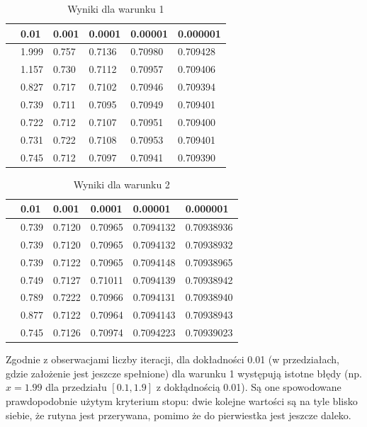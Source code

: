 \documentclass{article}
\begin{document}
\begin{table}[H]
\centering
\begin{tabular}{|l|l|l|l|l|l|}
\hline
& 0.01 & 0.001 & 0.0001 & 0.00001 & 0.000001 \\ \hline
[0.10, 1.90] & 1.999 & 0.757 & 0.7136 & 0.70980 & 0.709428 \\ \hline
[0.20, 1.90] & 1.157 & 0.730 & 0.7112 & 0.70957 & 0.709406 \\ \hline
[0.30, 1.90] & 0.827 & 0.717 & 0.7102 & 0.70946 & 0.709394 \\ \hline
[0.40, 1.90] & 0.739 & 0.711 & 0.7095 & 0.70949 & 0.709401 \\ \hline
[0.50, 1.90] & 0.722 & 0.712 & 0.7107 & 0.70951 & 0.709400 \\ \hline
[0.60, 1.90] & 0.731 & 0.722 & 0.7108 & 0.70953 & 0.709401 \\ \hline
[0.70, 1.90] & 0.745 & 0.712 & 0.7097 & 0.70941 & 0.709390 \\ \hline
\end{tabular}
\caption{Wyniki dla warunku 1}
\end{table}

\begin{table}[H]
\centering
\begin{tabular}{|l|l|l|l|l|l|}
\hline
& 0.01 & 0.001 & 0.0001 & 0.00001 & 0.000001 \\ \hline
[0.10, 1.90] & 0.739 & 0.7120 & 0.70965 & 0.7094132 & 0.70938936 \\ \hline
[0.20, 1.90] & 0.739 & 0.7120 & 0.70965 & 0.7094132 & 0.70938932 \\ \hline
[0.30, 1.90] & 0.739 & 0.7122 & 0.70965 & 0.7094148 & 0.70938965 \\ \hline
[0.40, 1.90] & 0.749 & 0.7127 & 0.71011 & 0.7094139 & 0.70938942 \\ \hline
[0.50, 1.90] & 0.789 & 0.7222 & 0.70966 & 0.7094131 & 0.70938940 \\ \hline
[0.60, 1.90] & 0.877 & 0.7122 & 0.70964 & 0.7094143 & 0.70938943 \\ \hline
[0.70, 1.90] & 0.745 & 0.7126 & 0.70974 & 0.7094223 & 0.70939023 \\ \hline
\end{tabular}
\caption{Wyniki dla warunku 2}
\end{table}

Zgodnie z obserwacjami liczby iteracji, dla dokładności 0.01 (w przedziałach, gdzie założenie jest jeszcze spełnione)
dla warunku 1 występują istotne błędy (np. $x=1.99$ dla przedziału $[0.1, 1.9]$ z dokłądnością 0.01). Są one spowodowane
prawdopodobnie użytym kryterium stopu: dwie kolejne wartości są na tyle blisko siebie, że rutyna jest przerywana, pomimo 
że do pierwiestka jest jeszcze daleko.
\end{document}
